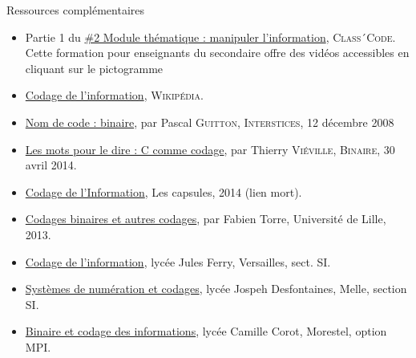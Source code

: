 \begin{gofurther}{Ressources complémentaires}
\begin{itemize}\jazzitem
	\item Partie 1 du \href{https://pixees.fr/classcode/formations/module2/#partie1}{\#2 Module thématique : manipuler l’information}, \textsc{Class´Code}. Cette formation pour enseignants du secondaire offre des vidéos accessibles en cliquant sur le pictogramme 
\end{itemize}

\begin{itemize}\jazzitem
	\item \href{https://fr.wikipedia.org/wiki/Codage_de_l'information}{Codage de l'information}, \textsc{Wikipédia}.
	\item \href{https://interstices.info/nom-de-code-binaire/}{Nom de code : binaire}, par Pascal \textsc{Guitton}, \textsc{Interstices}, 12 décembre 2008
	\item \href{https://www.lemonde.fr/blog/binaire/2014/04/30/linformatique-et-les-mots-pour-le-dire-voici-le-c-de-notre-a-b-c/}{Les mots pour le dire : C comme codage}, par Thierry \textsc{Viéville}, \textsc{Binaire}, 30 avril 2014.
\end{itemize}

\begin{itemize}\jazzitem
	\item \href{https://www.youtube.com/watch?v=kCrwLydx7S8}{Codage de l'Information}, Les capsules, 2014 (lien mort).
\end{itemize}

\begin{itemize}\jazzitem
	\item \href{https://fabien-torre.fr/Enseignement/Cours/Codages/}{Codages binaires et autres codages}, par Fabien Torre, Université de Lille, 2013.
\end{itemize}

\begin{itemize}\jazzitem
	\item \href{http://www.lycee-ferry-versailles.fr/si-new/5_1_donnees/cours/cours_transmission_donnees_2017.pdf}{Codage de l'information}, lycée Jules Ferry, Versailles, sect. SI.
	\item \href{http://si.lycee-desfontaines.eu/IMG/pdf/codages_cr.pdf}{Systèmes de numération et codages}, lycée Jospeh Desfontaines, Melle, section SI.
	\item \href{https://lycee-corot-morestel.fr/IMG/pdf/18_tp.pdf?PHPSESSID=eb7f940601d5e8034f2f068aa87ca7e7}{Binaire et codage des informations}, lycée Camille Corot, Morestel, option MPI.
\end{itemize}
\end{gofurther}


